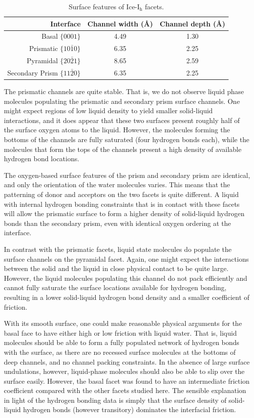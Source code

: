 \documentclass[journal = jpccck, manuscript = article]{achemso}
\begin{document}
\begin{table}[h]
\centering
\caption{Surface features of Ice-I$_\mathrm{h}$ facets.\label{tab:surf}}
\begin{tabular}{r|cc}  
\toprule
Interface & Channel width (\AA) & Channel depth (\AA) \\ 
\midrule
Basal  $\{0001\}$                 & 4.49 & 1.30 \\
Prismatic  $\{10\bar{1}0\}$       & 6.35 & 2.25 \\
Pyramidal  $\{20\bar{2}1\}$       & 8.65 & 2.59 \\
Secondary Prism  $\{11\bar{2}0\}$ & 6.35 & 2.25 \\ 
\bottomrule
\end{tabular}
\end{table}

The prismatic channels are quite stable. That is, we do not observe
liquid phase molecules populating the prismatic and secondary prism
surface channels. One might expect regions of low liquid density to
yield smaller solid-liquid interactions, and it does appear that these
two surfaces present roughly half of the surface oxygen atoms to the
liquid.  However, the molecules forming the bottoms of the channels
are fully saturated (four hydrogen bonds each), while the molecules
that form the tops of the channels present a high density of available
hydrogen bond locations.

The oxygen-based surface features of the prism and secondary prism are
identical, and only the orientation of the water molecules varies.
This means that the patterning of donor and acceptors on the two
facets is quite different. A liquid with internal hydrogen bonding
constraints that is in contact with these facets will allow the
prismatic surface to form a higher density of solid-liquid hydrogen
bonds than the secondary prism, even with identical oxygen ordering at
the interface.

In contrast with the prismatic facets, liquid state molecules do
populate the surface channels on the pyramidal facet. Again, one might
expect the interactions between the solid and the liquid in close
physical contact to be quite large.  However, the liquid molecules
populating this channel do not pack efficiently and cannot fully
saturate the surface locations available for hydrogen bonding,
resulting in a lower solid-liquid hydrogen bond density and a smaller
coefficient of friction.

With its smooth surface, one could make reasonable physical arguments
for the basal face to have either high or low friction with liquid
water. That is, liquid molecules should be able to form a fully
populated network of hydrogen bonds with the surface, as there are no
recessed surface molecules at the bottoms of deep channels, and no
channel packing constraints. In the absence of large surface
undulations, however, liquid-phase molecules should also be able to
slip over the surface easily. However, the basal facet was found to
have an intermediate friction coefficient compared with the other
facets studied here. The sensible explanation in light of the
hydrogen bonding data is simply that the surface density of
solid-liquid hydrogen bonds (however transitory) dominates the
interfacial friction.
\end{document}
